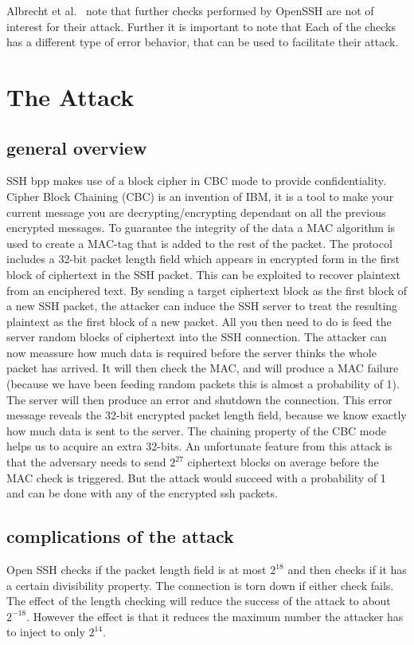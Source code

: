\documentclass[twocolumn]{article}
\begin{document}
\indent Albrecht et al.~\cite{Albrecht2009} note that further checks performed by OpenSSH are not of interest for their attack. Further it is important to note that Each of the checks has a different type of error behavior, that can be used to facilitate their attack.




\section{The Attack}
\subsection*{general overview}
SSH bpp makes use of a block cipher in CBC mode to provide confidentiality. Cipher Block Chaining (CBC) is an invention of IBM, it is a tool to make your current message you are decrypting/encrypting dependant on all the previous encrypted messages. To guarantee the integrity of the data a MAC algorithm is used to create a MAC-tag that is added to the rest of the packet. The protocol includes a 32-bit packet length field which appears in encrypted form in the first block of ciphertext in the SSH packet. This can be exploited to recover plaintext from an enciphered text. By sending a target ciphertext block as the first block of a new SSH packet, the attacker can induce the SSH server to treat the resulting plaintext as the first block of a new packet. All you then need to do is feed the server random blocks of ciphertext into the SSH connection. The attacker can now meassure how much data is required before the server thinks the whole packet has arrived. It will then check the MAC, and will produce a MAC failure (because we have been feeding random packets this is almost a probability of 1). The server will then produce an error and shutdown the connection. This error message reveals the 32-bit encrypted packet length field, because we know exactly how much data is sent to the server. The chaining property of the CBC mode helps us to acquire an extra 32-bits. An unfortunate feature from this attack is that the adversary needs to send $2^{27}$ ciphertext blocks on average before the MAC check is triggered. But the attack would succeed with a probability of 1 and can be done with any of the encrypted ssh packets.
\subsection{complications of the attack}
Open SSH checks if the packet length field is at most $2^{18}$ and then checks if it has a certain divisibility property. The connection is torn down if either check fails. The effect of the length checking will reduce the success of the attack to about $2^{-18}$. However the effect is that it reduces the maximum number the attacker has to inject to only $2^{14}$.
\end{document}

